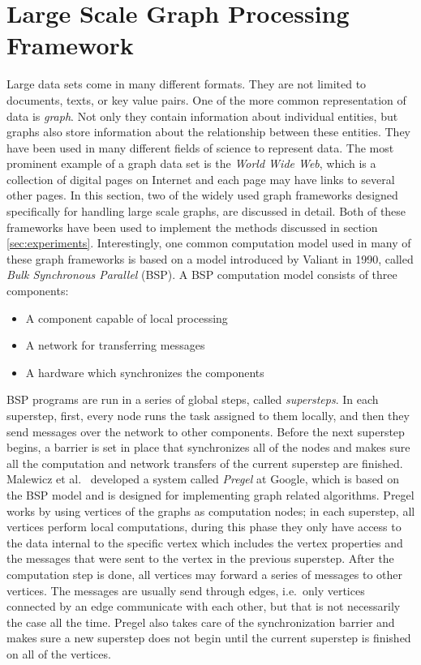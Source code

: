 \documentclass[english]{tktltiki}
\begin{document}
\section{Large Scale Graph Processing Framework}
\label{sec:biggraph}
Large data sets come in many different formats. They are not limited to documents, texts, or key value pairs. One of the more common representation of data is \textit{graph}. Not only they contain information about individual entities, but graphs also store information about the relationship between these entities. They have been used in many different fields of science to represent data. The most prominent example of a graph data set is the \textit{World Wide Web}, which is a collection of digital pages on Internet and each page may have links to several other pages. In this section, two of the widely used graph frameworks designed specifically for handling large scale graphs, are discussed in detail. Both of these frameworks have been used to implement the methods discussed in section \ref{sec:experiments}. Interestingly, one common computation model used in many of these graph frameworks is based on a model introduced by Valiant \cite{valiant90} in 1990, called \textit{Bulk Synchronous Parallel} (BSP). A BSP computation model consists of three components: 
\begin{itemize}
\item
A component capable of local processing
\item
A network for transferring messages
\item
A hardware which synchronizes the components
\end{itemize}

BSP programs are run in a series of global steps, called \textit{supersteps}. In each superstep, first, every node runs the task assigned to them locally, and then they send messages over the network to other components. Before the next superstep begins, a barrier is set in place that synchronizes all of the nodes and makes sure all the computation and network transfers of the current superstep are finished. Malewicz et al.\ \cite{malewicz10} developed a system called \textit{Pregel} at Google, which is based on the BSP model and is designed for implementing graph related algorithms. Pregel works by using vertices of the graphs as computation nodes; in each superstep, all vertices perform local computations, during this phase they only have access to the data internal to the specific vertex which includes the vertex properties and the messages that were sent to the vertex in the previous superstep. After the computation step is done, all vertices may forward a series of messages to other vertices. The messages are usually send through edges, i.e.\ only vertices connected by an edge communicate with each other, but that is not necessarily the case all the time. Pregel also takes care of the synchronization barrier and makes sure a new superstep does not begin until the current superstep is finished on all of the vertices.
\end{document}
